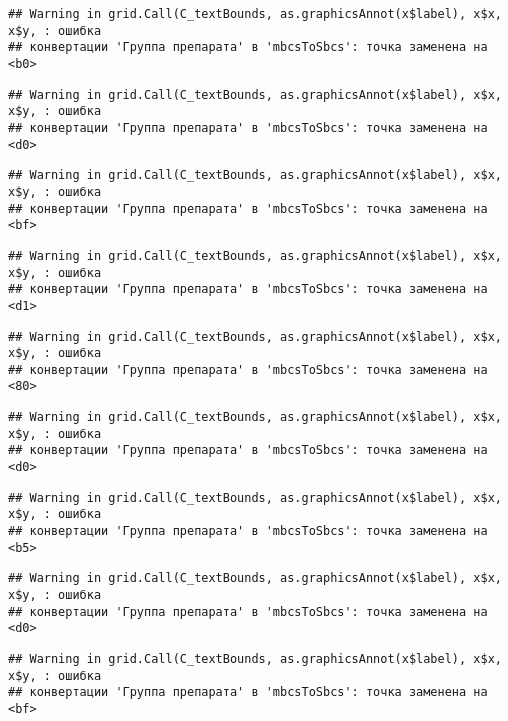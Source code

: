 \documentclass[
]{article}
\begin{document}
\begin{verbatim}
## Warning in grid.Call(C_textBounds, as.graphicsAnnot(x$label), x$x, x$y, : ошибка
## конвертации 'Группа препарата' в 'mbcsToSbcs': точка заменена на <b0>
\end{verbatim}

\begin{verbatim}
## Warning in grid.Call(C_textBounds, as.graphicsAnnot(x$label), x$x, x$y, : ошибка
## конвертации 'Группа препарата' в 'mbcsToSbcs': точка заменена на <d0>
\end{verbatim}

\begin{verbatim}
## Warning in grid.Call(C_textBounds, as.graphicsAnnot(x$label), x$x, x$y, : ошибка
## конвертации 'Группа препарата' в 'mbcsToSbcs': точка заменена на <bf>
\end{verbatim}

\begin{verbatim}
## Warning in grid.Call(C_textBounds, as.graphicsAnnot(x$label), x$x, x$y, : ошибка
## конвертации 'Группа препарата' в 'mbcsToSbcs': точка заменена на <d1>
\end{verbatim}

\begin{verbatim}
## Warning in grid.Call(C_textBounds, as.graphicsAnnot(x$label), x$x, x$y, : ошибка
## конвертации 'Группа препарата' в 'mbcsToSbcs': точка заменена на <80>
\end{verbatim}

\begin{verbatim}
## Warning in grid.Call(C_textBounds, as.graphicsAnnot(x$label), x$x, x$y, : ошибка
## конвертации 'Группа препарата' в 'mbcsToSbcs': точка заменена на <d0>
\end{verbatim}

\begin{verbatim}
## Warning in grid.Call(C_textBounds, as.graphicsAnnot(x$label), x$x, x$y, : ошибка
## конвертации 'Группа препарата' в 'mbcsToSbcs': точка заменена на <b5>
\end{verbatim}

\begin{verbatim}
## Warning in grid.Call(C_textBounds, as.graphicsAnnot(x$label), x$x, x$y, : ошибка
## конвертации 'Группа препарата' в 'mbcsToSbcs': точка заменена на <d0>
\end{verbatim}

\begin{verbatim}
## Warning in grid.Call(C_textBounds, as.graphicsAnnot(x$label), x$x, x$y, : ошибка
## конвертации 'Группа препарата' в 'mbcsToSbcs': точка заменена на <bf>
\end{verbatim}
\end{document}
